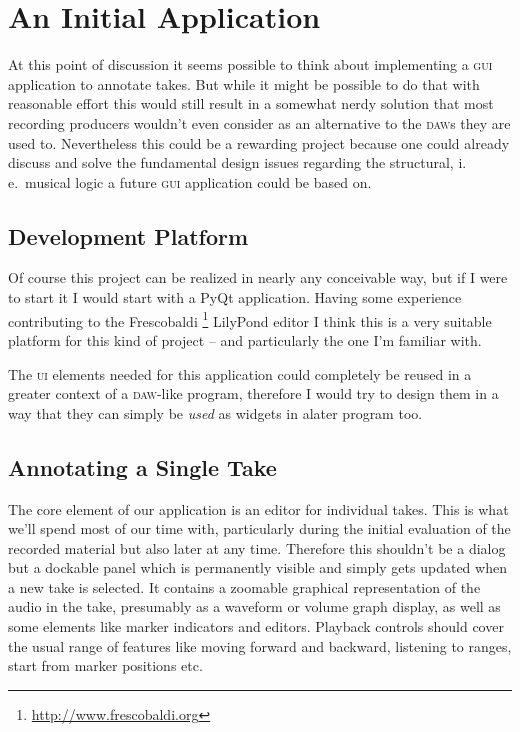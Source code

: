 \documentclass[11pt,a4paper]{article}
\begin{document}
\section{An Initial Application}
At this point of discussion it seems possible to think about implementing a \textsc{gui} application to annotate takes.
But while it might be possible to do that with reasonable effort this would still result in a somewhat nerdy solution that most recording producers wouldn't even consider as an alternative to the \textsc{daw}s they are used to.
Nevertheless this could be a rewarding project because one could already discuss and solve the fundamental design issues regarding the structural, i.\,e.\ musical logic a future \textsc{gui} application could be based on.

\subsection{Development Platform}
Of course this project can be realized in nearly any conceivable way, but if I were to start it I would start with a PyQt application.
Having some experience contributing to the Frescobaldi%
\footnote{\url{http://www.frescobaldi.org}}
LilyPond editor I think this is a very suitable platform for this kind of project -- and particularly the one I'm familiar with.

The \textsc{ui} elements needed for this application could completely be reused in a greater context of a \textsc{daw}-like program, therefore I would try to design them in a way that they can simply be \emph{used} as widgets in alater program too.

\subsection{Annotating a Single Take}
The core element of our application is an editor for individual takes.
This is what we'll spend most of our time with, particularly during the initial evaluation of the recorded material but also later at any time.
Therefore this shouldn't be a dialog but a dockable panel which is permanently visible and simply gets updated when a new take is selected.
It contains a zoomable graphical representation of the audio in the take, presumably as a waveform or volume graph display, as well as some elements like marker indicators and editors.
Playback controls should cover the usual range of features like moving forward and backward, listening to ranges, start from marker positions etc.
\end{document}
